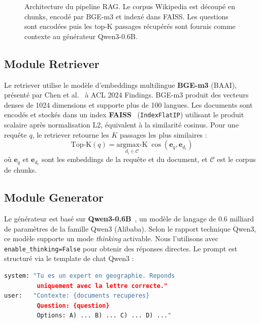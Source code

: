 \documentclass[12pt,a4paper]{article}
\begin{document}
\begin{figure}[H]
{\begin{tikzpicture}
\end{tikzpicture}
}
\caption{Architecture du pipeline RAG. Le corpus Wikipedia est découpé en chunks, encodé par BGE-m3 et indexé dans FAISS. Les questions sont encodées puis les top-K passages récupérés sont fournis comme contexte au générateur Qwen3-0.6B.}
\label{fig:architecture}
\end{figure}

\subsection{Module Retriever}

Le retriever utilise le modèle d'embeddings multilingue \textbf{BGE-m3} (BAAI), présenté par Chen et al.~\cite{chen2024bgem3} à ACL 2024 Findings. BGE-m3 produit des vecteurs denses de 1024 dimensions et supporte plus de 100 langues. Les documents sont encodés et stockés dans un index \textbf{FAISS}~\cite{johnson2019faiss} (\texttt{IndexFlatIP}) utilisant le produit scalaire après normalisation L2, équivalent à la similarité cosinus. Pour une requête $q$, le retriever retourne les $K$ passages les plus similaires :
\begin{equation}
  \text{Top-K}(q) = \underset{d_i \in \mathcal{C}}{\text{argmax-K}} \; \cos(\mathbf{e}_q, \mathbf{e}_{d_i})
\end{equation}
où $\mathbf{e}_q$ et $\mathbf{e}_{d_i}$ sont les embeddings de la requête et du document, et $\mathcal{C}$ est le corpus de chunks.

\subsection{Module Generator}

Le générateur est basé sur \textbf{Qwen3-0.6B}~\cite{yang2025qwen3}, un modèle de langage de 0.6 milliard de paramètres de la famille Qwen3 (Alibaba). Selon le rapport technique Qwen3, ce modèle supporte un mode \textit{thinking} activable. Nous l'utilisons avec \texttt{enable\_thinking=False} pour obtenir des réponses directes. Le prompt est structuré via le template de chat Qwen3 :

\begin{lstlisting}[language=Python, caption={Prompt template pour le mode RAG}]
system: "Tu es un expert en geographie. Reponds
         uniquement avec la lettre correcte."
user:   "Contexte: {documents recuperes}
         Question: {question}
         Options: A) ... B) ... C) ... D) ..."
\end{lstlisting}
\end{document}
